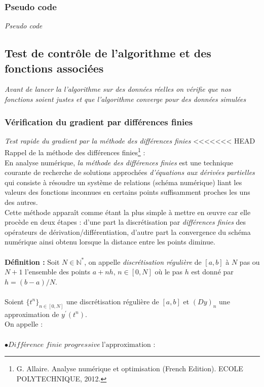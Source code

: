 \documentclass{article}
\begin{document}
\subsubsection{Pseudo code}
\textit{Pseudo code}



\subsection{Test de contrôle de l'algorithme et des fonctions associées}
\textit{Avant de lancer la l'algorithme sur des données réelles on vérifie que nos fonctions soient justes et que l'algorithme converge pour des données simulées}

\subsubsection{Vérification du gradient par différences finies}
\textit{Test rapide du gradient par la méthode des différences finies}
<<<<<<< HEAD
Rappel de la méthode des différences finies\footnote{

G. Allaire. Analyse numérique et optimisation (French Edition). ECOLE POLYTECHNIQUE, 2012.} :\\
En analyse numérique, \textit{la méthode des différences finies} est une technique courante de recherche de solutions approchées \textit{d'équations aux dérivées partielles} qui consiste à résoudre un système de relations (schéma numérique) liant les valeurs des fonctions inconnues en certains points suffisamment proches les uns des autres.\\

Cette méthode apparaît comme étant la plus simple à mettre en œuvre car elle procède en deux étapes : d'une part la discrétisation par \textit{différences finies} des opérateurs de dérivation/différentiation, d'autre part la convergence du schéma numérique ainsi obtenu lorsque la distance entre les points diminue.\\
$ $\\
\textbf{Définition :}
Soit $N \in \mathbb{N}^{*}$, on appelle \textit{discrétisation régulière} de $[a,b]$ à $N$ pas ou $N+1$ l'ensemble des points $a+nh$, $n \in [0,N]$ o\`{u} le pas $h$ est donné par$h=(b-a)/N$.\\
$ $\\
Soient $\{t^{n}\}_{n\in[0,N]}$ une discrétisation régulière de $[a, b]$ et $(Dy)_{n}$ une approximation de $y^{'}(t^{n})$.\\
On appelle :\\
$ $\\
$\bullet \textit{Différence finie progressive}~\text{l'approximation}$ :\\
\end{document}

